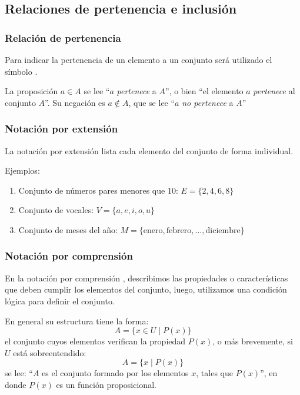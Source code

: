 \subsection{Relaciones de pertenencia e inclusión}

\subsubsection{Relación de pertenencia}

Para indicar la \gls{pertenencia}  de un elemento a un conjunto será utilizado el símbolo .

La proposición $a \in A$ se lee ``$a$ \textit{pertenece} a $A$'', o bien ``el elemento $a$ \textit{pertenece} al conjunto $A$''. Su negación es $a \not \in A$, que se lee ``$a$ \textit{no pertenece} a $A$''

\subsubsection{Notación por extensión}

La notación por extensión  lista cada elemento del conjunto de forma individual.

Ejemplos:

\begin{enumerate}
	\item Conjunto de números pares menores que 10: $E = \{2, 4, 6, 8\}$
	\item Conjunto de vocales: \(V = \{a, e, i, o, u\}\)
	\item Conjunto de meses del año: \(M = \{\text{enero}, \text{febrero}, \ldots, \text{diciembre}\}\)
\end{enumerate}

\subsubsection{Notación por comprensión}

En la notación por comprensión , describimos las propiedades o características que deben cumplir los elementos del conjunto, luego, utilizamos una condición lógica para definir el conjunto.

En general su estructura tiene la forma:
\[ A = \{ x \in U \mid P(x) \}\]
el conjunto cuyos elementos verifican la propiedad $P(x)$, o más brevemente, si $U$ está sobreentendido:
\[ A = \{ x \mid P(x) \}\]
se lee: ``$A$ es el conjunto formado por los elementos $x$, tales que $P(x)$'', en donde $P(x)$ es un función proposicional.

